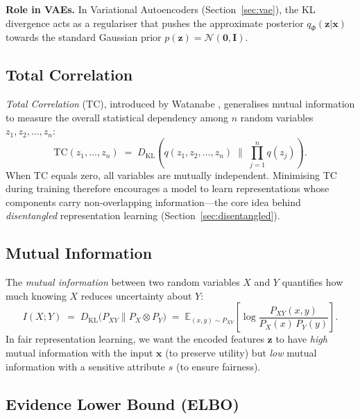 \noindent\textbf{Role in VAEs.}
In Variational Autoencoders (Section~\ref{sec:vae}), the KL divergence
acts as a regulariser that pushes the approximate posterior
$q_\Phi(\mathbf{z}|\mathbf{x})$ towards the standard Gaussian prior
$p(\mathbf{z}) = \mathcal{N}(\mathbf{0}, \mathbf{I})$.

\subsection{Total Correlation}
\label{subsec:tc}

\emph{Total Correlation} (TC), introduced by Watanabe
\cite{watanabe1960}, generalises mutual information to measure the
overall statistical dependency among $n$ random variables
$z_1, z_2, \ldots, z_n$:
\begin{equation}
  \mathrm{TC}(z_1, \ldots, z_n)
  \;=\; D_{\mathrm{KL}}\!\left(
        q(z_1, z_2, \ldots, z_n)
        \;\Big\|\;
        \prod_{j=1}^{n} q(z_j)
        \right).
  \label{eq:total_correlation}
\end{equation}
When TC equals zero, all variables are mutually independent.
Minimising TC during training therefore encourages a model to learn
representations whose components carry non-overlapping information—the
core idea behind \emph{disentangled} representation learning
(Section~\ref{sec:disentangled}).

\subsection{Mutual Information}
\label{subsec:mutual_info}

The \emph{mutual information} between two random variables $X$ and $Y$
quantifies how much knowing $X$ reduces uncertainty about $Y$:
\begin{equation}
  I(X; Y)
  \;=\; D_{\mathrm{KL}}\bigl(P_{XY} \| P_X \otimes P_Y\bigr)
  \;=\; \mathbb{E}_{(x,y)\sim P_{XY}}
        \!\left[\log \frac{P_{XY}(x,y)}{P_X(x)\,P_Y(y)}\right].
  \label{eq:mutual_info}
\end{equation}
In fair representation learning, we want the encoded features
$\mathbf{z}$ to have \emph{high} mutual information with the input
$\mathbf{x}$ (to preserve utility) but \emph{low} mutual information
with a sensitive attribute $s$ (to ensure fairness).

\subsection{Evidence Lower Bound (ELBO)}
\label{subsec:elbo}

